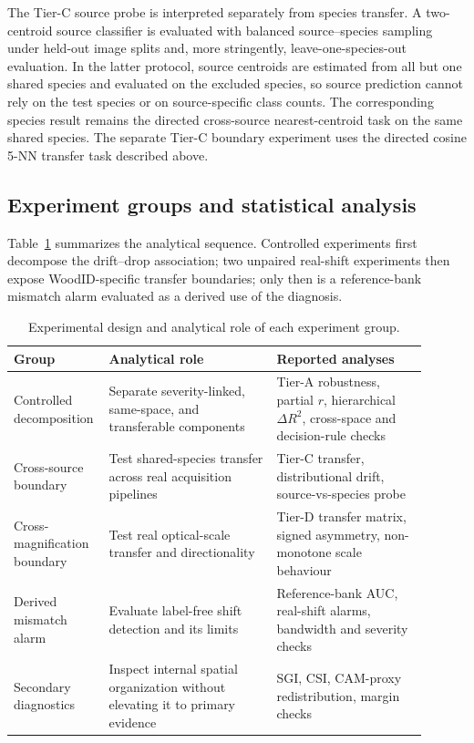 \documentclass[a4paper,fleqn]{els-cas-templates/cas-sc}
\begin{document}
The Tier-C source probe is interpreted separately from species transfer. A
two-centroid source classifier is evaluated with balanced source--species
sampling under held-out image splits and, more stringently,
leave-one-species-out evaluation. In the latter protocol, source centroids are
estimated from all but one shared species and evaluated on the excluded species,
so source prediction cannot rely on the test species or on source-specific class
counts. The corresponding species result remains the directed cross-source
nearest-centroid task on the same shared species. The separate Tier-C boundary
experiment uses the directed cosine 5-NN transfer task described above.

\subsection{Experiment groups and statistical analysis}
\label{sec:quant_protocol}

Table~\ref{tab:experiment_map} summarizes the analytical sequence. Controlled
experiments first decompose the drift--drop association; two unpaired real-shift
experiments then expose WoodID-specific transfer boundaries; only then is a
reference-bank mismatch alarm evaluated as a derived use of the diagnosis.

\begin{table}[pos=htbp]
\centering
\caption{Experimental design and analytical role of each experiment group.}
\label{tab:experiment_map}
\footnotesize
\begin{tabular}{p{0.16\linewidth}p{0.39\linewidth}p{0.35\linewidth}}
\toprule
Group & Analytical role & Reported analyses \\
\midrule
Controlled decomposition & Separate severity-linked, same-space, and transferable components & Tier-A robustness, partial $r$, hierarchical $\Delta R^2$, cross-space and decision-rule checks \\
Cross-source boundary & Test shared-species transfer across real acquisition pipelines & Tier-C transfer, distributional drift, source-vs-species probe \\
Cross-magnification boundary & Test real optical-scale transfer and directionality & Tier-D transfer matrix, signed asymmetry, non-monotone scale behaviour \\
Derived mismatch alarm & Evaluate label-free shift detection and its limits & Reference-bank AUC, real-shift alarms, bandwidth and severity checks \\
Secondary diagnostics & Inspect internal spatial organization without elevating it to primary evidence & SGI, CSI, CAM-proxy redistribution, margin checks \\
\bottomrule
\end{tabular}
\end{table}
\end{document}
